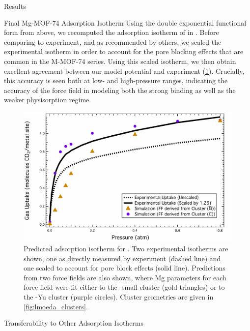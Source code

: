\begin{section}{Results}
\begin{subsection}{Final Mg-MOF-74 {\co} Adsorption Isotherm}
Using the double exponential functional form from above, we recomputed the
 adsorption isotherm of \co in \mgmof. Before comparing to experiment, and as
recommended by others,\cite{Haldoupis2015a} we scaled the experimental
isotherm in order to account for the pore blocking effects that are common in
the M-MOF-74 series. Using this scaled isotherm, we then obtain excellent
agreement between our model potential and experiment
(\cref{fig:lmoeda-isotherm}). Crucially, this accuracy is seen both at low-
and high-pressure ranges, indicating the accuracy of the force field in
modeling both the
strong  binding as well as the weaker physisorption regime.



    \begin{figure}
    \centering
    \includegraphics[width=1.0\textwidth]{lmoeda/mgmof_isotherm.pdf}
    \caption[Predicted \co Adsorption Isotherm for \mgmof]
{Predicted \co adsorption isotherm for \mgmof. Two experimental isotherms are
shown, one as directly measured by experiment (dashed line) and one scaled to
account for pore block effects (solid line). Predictions from two force fields
are also shown, where Mg parameters for each force field were fit either to
the \mgmof-small cluster (gold triangles) or to the \mgmof-Yu cluster (purple
circles). Cluster geometries are given in \cref{fig:lmoeda_clusters}.
            }
    \label{fig:lmoeda-isotherm}
    \end{figure}

\end{subsection}
\begin{subsection}{Transferability to Other Adsorption Isotherms}


\end{subsection}
\end{section}
